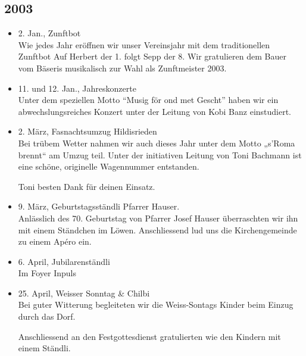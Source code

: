 \subsection*{2003}

\begin{history}

    \begin{itemize}

        \item 2. Jan., Zunftbot\\
              Wie jedes Jahr eröffnen wir unser Vereinsjahr mit dem traditionellen
              Zunftbot Auf Herbert der 1. folgt Sepp der 8. Wir gratulieren dem Bauer
              vom Bäseris musikalisch zur Wahl als Zunftmeister 2003.

        \item 11. und 12. Jan., Jahreskonzerte\\
              Unter dem speziellen Motto \enquote{Musig för ond met Gescht} haben wir
              ein abwechslungsreiches Konzert unter der Leitung von Kobi Banz
              einstudiert.

        \item 2. März, Fasnachtsumzug Hildisrieden\\
              Bei trübem Wetter nahmen wir auch dieses Jahr unter dem Motto „s’Roma
              brennt“ am Umzug teil. Unter der initiativen Leitung von Toni Bachmann
              ist eine schöne, originelle Wagennummer entstanden.

              Toni besten Dank für deinen Einsatz.

        \item 9. März, Geburtstagsständli Pfarrer Hauser.\\
              Anlässlich des 70. Geburtstag von Pfarrer Josef Hauser überraschten wir
              ihn mit einem Ständchen im Löwen. Anschliessend lud uns die
              Kirchengemeinde zu einem Apéro ein.

        \item 6. April, Jubilarenständli\\
              Im Foyer Inpuls

        \item 25. April, Weisser Sonntag \& Chilbi\\
              Bei guter Witterung begleiteten wir die Weiss-Sontags Kinder beim Einzug
              durch das Dorf.

              Anschliessend an den Festgottesdienst gratulierten wie den Kindern mit
              einem Ständli.


\end{itemize}
\end{history}
